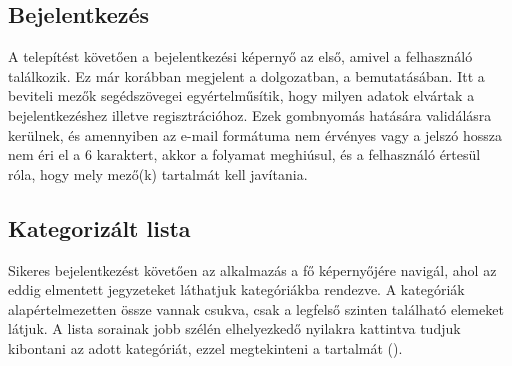 \subsection{Bejelentkezés}
A telepítést követően a bejelentkezési képernyő az első, amivel a felhasználó találkozik. Ez már korábban megjelent a dolgozatban, a  bemutatásában. Itt a beviteli mezők segédszövegei egyértelműsítik, hogy milyen adatok elvártak a bejelentkezéshez illetve regisztrációhoz. Ezek gombnyomás hatására validálásra kerülnek, és amennyiben az e-mail formátuma nem érvényes vagy a jelszó hossza nem éri el a 6 karaktert, akkor a folyamat meghiúsul, és a felhasználó értesül róla, hogy mely mező(k) tartalmát kell javítania.

\subsection{Kategorizált lista}
Sikeres bejelentkezést követően az alkalmazás a fő képernyőjére navigál, ahol az eddig elmentett jegyzeteket láthatjuk kategóriákba rendezve. A kategóriák alapértelmezetten össze vannak csukva, csak a legfelső szinten található elemeket látjuk. A lista sorainak jobb szélén elhelyezkedő nyilakra kattintva tudjuk kibontani az adott kategóriát, ezzel megtekinteni a tartalmát ().

